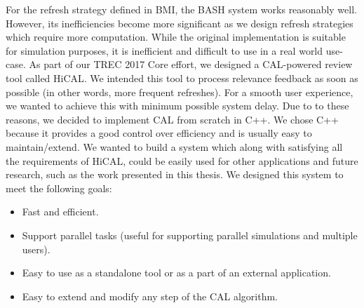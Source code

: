 For the refresh strategy defined in BMI, the BASH system works reasonably well.
However, its inefficiencies become more significant as we design refresh
strategies which require more computation. While the original
implementation is suitable for simulation purposes, it is inefficient and
difficult to use in a real world use-case.
As part of our TREC 2017 Core effort, we designed a CAL-powered review tool
called HiCAL. We intended this tool to process relevance feedback as soon as
possible (in other words, more frequent refreshes). For a smooth user
experience, we wanted to achieve this with minimum possible system delay. Due to
to these reasons, we decided to implement CAL from scratch in C++. We chose C++
because it provides a good control over efficiency and is usually easy to
maintain/extend.
We wanted to build a system which along with satisfying all the requirements of
HiCAL, could be easily used for other applications and future research, such as
the work presented in this thesis. We designed this system to meet the following
goals:
\begin{itemize}
\item Fast and efficient.
\item Support parallel tasks (useful for supporting parallel simulations and
multiple users).
\item Easy to use as a standalone tool or as a part of an external application.
\item Easy to extend and modify any step of the CAL algorithm.
\end{itemize}
